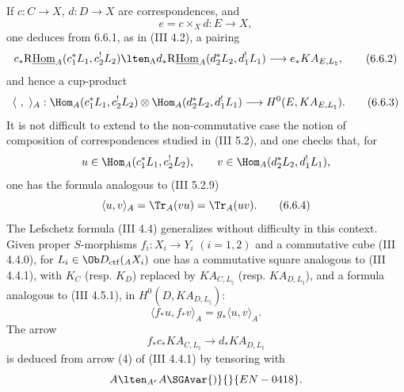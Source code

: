 If $c:C\to X$, $d:D\to X$ are correspondences, and
\[
e=c\times_Xd:E\to X,
\]
one deduces from 6.6.1, as in (III 4.2), a pairing
\begin{equation}
c_*\mathrm{R}\underline{\mathrm{Hom}}_A(c_1^*L_1,c_2^!L_2)
\lten_{\Lambda}
d_*\mathrm{R}\underline{\mathrm{Hom}}_A(d_2^*L_2,d_1^!L_1)
\longrightarrow
e_*KA_{E,L_{\natural}},
\tag{6.6.2}
\end{equation}
and hence a cup-product
\begin{equation}
\langle\ ,\ \rangle_A:
\Hom_A(c_1^*L_1,c_2^!L_2)\otimes
\Hom_A(d_2^*L_2,d_1^!L_1)
\longrightarrow
H^0(E,KA_{E,L_{\natural}}).
\tag{6.6.3}
\end{equation}
It is not difficult to extend to the non-commutative case the notion of composition of correspondences studied in (III 5.2), and one checks that, for
\[
u\in\Hom_A(c_1^*L_1,c_2^!L_2),\qquad
v\in\Hom_A(d_2^*L_2,d_1^!L_1),
\]
one has the formula analogous to (III 5.2.9)
\begin{equation}
\langle u,v\rangle_A=\Tr_A(vu)=\Tr_A(uv).
\tag{6.6.4}
\end{equation}
The Lefschetz formula (III 4.4) generalizes without difficulty in this context. Given proper $S$-morphisms $f_i:X_i\to Y_i$ $(i=1,2)$ and a commutative cube (III 4.4.0), for $L_i\in\Ob D_{\mathrm{ctf}}({}_AX_i)$ one has a commutative square analogous to (III 4.4.1), with $K_C$ (resp. $K_D$) replaced by $KA_{C,L_{\natural}}$ (resp. $KA_{D,L_{\natural}}$), and a formula analogous to (III 4.5.1), in $H^0(D,KA_{D,L_{\natural}})$:
\begin{equation}
\langle f_*u,f_*v\rangle_A=g_*\langle u,v\rangle_A.
\tag{6.6.5}
\end{equation}
The arrow
\[
f_*c_*KA_{C,L_{\natural}}\longrightarrow d_*KA_{D,L_{\natural}}
\]
is deduced from arrow (4) of (III 4.4.1) by tensoring with
\[
A\lten_{A^e}A \SGAvar{)}{}{EN-0418}.
\]

